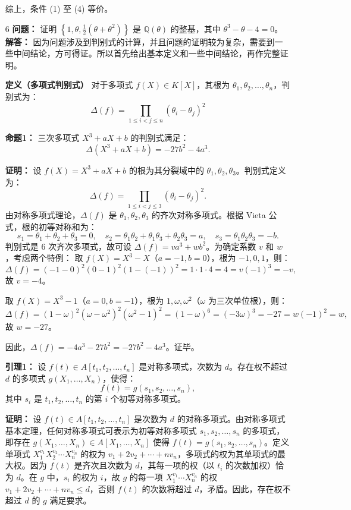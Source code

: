 \documentclass[UTF8]{ctexart}
\begin{document}
\begin{enumerate}
综上，条件 (1) 至 (4) 等价。

\item[6] 
\textbf{问题：} 证明 \(\left\{1, \theta, \frac{1}{2}(\theta + \theta^2)\right\}\) 是 \(\mathbb{Q}(\theta)\) 的整基，其中 \(\theta^3 - \theta - 4 = 0\)。\\
\textbf{解答：} 因为问题涉及到判别式的计算，并且问题的证明较为复杂，需要到一些中间结论，方可得证。所以首先给出基本定义和一些中间结论，再作完整证明。

\textbf{定义（多项式判别式）}
对于多项式 \(f(X) \in K[X]\)，其根为 \(\theta_1, \theta_2, \dots, \theta_n\)，判别式为：
\[
\Delta(f) = \prod_{1 \leq i < j \leq n} (\theta_i - \theta_j)^2
\]

\textbf{命题1：} 三次多项式 \( X^3 + aX + b \) 的判别式满足：
\[
\Delta(X^3 + aX + b) = -27b^2 - 4a^3.
\]

\textbf{证明：} 设 \( f(X) = X^3 + aX + b \) 的根为其分裂域中的 \( \theta_1, \theta_2, \theta_3 \)。判别式定义为：
\[
\Delta(f) = \prod_{1 \leqslant i < j \leqslant 3} (\theta_i - \theta_j)^2.
\]
由对称多项式理论，\(\Delta(f)\) 是 \( \theta_1, \theta_2, \theta_3 \) 的齐次对称多项式。根据 Vieta 公式，根的初等对称和为：
\[
s_1 = \theta_1 + \theta_2 + \theta_3 = 0, \quad s_2 = \theta_1 \theta_2 + \theta_1 \theta_3 + \theta_2 \theta_3 = a, \quad s_3 = \theta_1 \theta_2 \theta_3 = -b.
\]
判别式是 6 次齐次多项式，故可设 \(\Delta(f) = v a^3 + w b^2\)。为确定系数 \( v \) 和 \( w \)，考虑两个特例：
 取 \( f(X) = X^3 - X \)（\( a = -1, b = 0 \)），根为 \(-1, 0, 1\)，则：
  \[
  \Delta(f) = (-1 - 0)^2 (0 - 1)^2 (1 - (-1))^2 = 1 \cdot 1 \cdot 4 = 4 = v (-1)^3 = -v,
  \]
  故 \( v = -4 \)。
  
 取 \( f(X) = X^3 - 1 \)（\( a = 0, b = -1 \)），根为 \( 1, \omega, \omega^2 \)（\(\omega\) 为三次单位根），则：
  \[
  \Delta(f) = (1 - \omega)^2 (\omega - \omega^2)^2 (\omega^2 - 1)^2 = (1 - \omega)^6 = (-3\omega)^3 = -27 = w (-1)^2 = w,
  \]
  故 \( w = -27 \)。
  
因此，\(\Delta(f) = -4 a^3 - 27 b^2 = -27 b^2 - 4 a^3\)。证毕。

\textbf{引理1：} 设 \( f(t) \in A[t_1, t_2, \ldots, t_n] \) 是对称多项式，次数为 \( d \)。存在权不超过 \( d \) 的多项式 \( g(X_1, \ldots, X_n) \)，使得：
\[
f(t) = g(s_1, s_2, \ldots, s_n),
\]
其中 \( s_i \) 是 \( t_1, t_2, \ldots, t_n \) 的第 \( i \) 个初等对称多项式。

\textbf{证明：} 设 \( f(t) \in A[t_1, t_2, \ldots, t_n] \) 是次数为 \( d \) 的对称多项式。由对称多项式基本定理，任何对称多项式可表示为初等对称多项式 \( s_1, s_2, \ldots, s_n \) 的多项式，即存在 \( g(X_1, \ldots, X_n) \in A[X_1, \ldots, X_n] \) 使得 \( f(t) = g(s_1, s_2, \ldots, s_n) \)。定义单项式 \( X_1^{v_1} X_2^{v_2} \cdots X_n^{v_n} \) 的权为 \( v_1 + 2 v_2 + \cdots + n v_n \)，多项式的权为其单项式的最大权。因为 \( f(t) \) 是齐次且次数为 \( d \)，其每一项的权（以 \( t_i \) 的次数加权）恰为 \( d \)。在 \( g \) 中，\( s_i \) 的权为 \( i \)，故 \( g \) 的每一项 \( X_1^{v_1} \cdots X_n^{v_n} \) 的权 \( v_1 + 2 v_2 + \cdots + n v_n \leq d \)，否则 \( f(t) \) 的次数将超过 \( d \)，矛盾。因此，存在权不超过 \( d \) 的 \( g \) 满足要求。


\end{enumerate}
\end{document}
